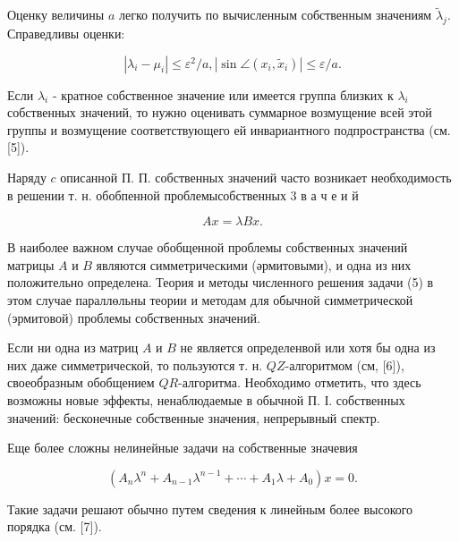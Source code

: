 \documentclass[10pt]{article}
\begin{document}
Оценку величины $a$ легко получить по вычисленным собственным значениям $\tilde{\lambda}_{j}$. Справедливы оценки:



\[

\left|\lambda_{i}-\mu_{i}\right| \leqslant \varepsilon^{2} / a,\left|\sin \angle\left(x_{i}, \tilde{x}_{i}\right)\right| \leqslant \varepsilon / a .

\]



Если $\lambda_{i}$ - кратное собственное значение или имеется группа близких к $\lambda_{i}$ собственных значений, то нужно оценивать суммарное возмущение всей этой группы и возмущение соответствующего ей инвариантного подпространства (см. [5]).



Наряду $c$ описанной П. П. собственных значений часто возникает необходимость в решении т. н. обобпенной проблемысобственных 3 в $а$ ч е и й



\[

A x=\lambda B x .

\]



В наиболее важном случае обобщенной проблемы собственных значений матрицы $A$ и $B$ являются симметрическими (әрмитовыми), и одна из них положительно определена. Теория и методы численного решения задачи (5) в этом случае параллөльны теории и методам для обычной симметрической (эрмитовой) проблемы собственных значений.



Если ни одна из матриц $A$ и $B$ не является определенвой или хотя бы одна из них даже симметрической, то пользуются т. н. $Q Z$-алгоритмом (см, [6]), своеоб́разным обобщением $Q R$-алгоритма. Необходимо отметить, что здесь возможны новые эффекты, ненаблюдаемые в обычной П. І. собственных значений: бесконечные собственные значения, непрерывный спектр.



Еще более сложны нелинейные задачи на собственные значевия



\[

\left(A_{n} \lambda^{n}+A_{n-1} \lambda^{n-1}+\cdots+A_{1} \lambda+A_{0}\right) x=0 .

\]



Такие задачи решают обычно путем сведения к линейным более высокого порядка (см. [7]).
\end{document}
